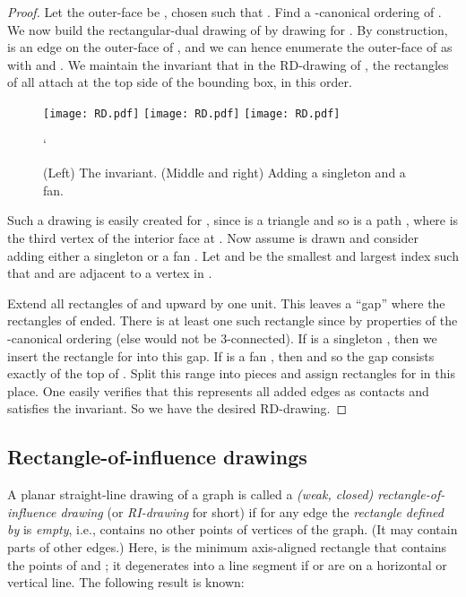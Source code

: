 \documentclass[12pt]{article}
\begin{document}
\begin{proof}
Let the outer-face be , chosen such that .
Find a -canonical ordering  of .  We
now build the rectangular-dual drawing of  by drawing  for 
.
By construction,  is an edge on the outer-face of , and
we can hence enumerate the outer-face of  as 
with  and .  
We maintain the invariant
that in the RD-drawing of , the rectangles of 
 all attach at the top side of the bounding
box, in this order.

\begin{figure}[ht]
\hspace*{\fill}
\texttt{[image: RD.pdf]}
\hspace*{\fill}
\texttt{[image: RD.pdf]}
\hspace*{\fill}
\texttt{[image: RD.pdf]}
\hspace*{\fill}
\caption{(Left) The invariant.  (Middle and right) 
Adding a singleton and a fan.  }
\label{fig:RD}`
\end{figure}

Such a drawing is easily created for , since  is a triangle and
so  is a path , where  is the third vertex
of the interior face at .
Now assume  is drawn and consider adding either
a singleton or a fan .  Let  and  be the smallest and 
largest index such that  and  are adjacent to a vertex in .  

Extend all rectangles of  and  upward
by one unit.    This leaves a ``gap'' where the rectangles
of  ended. There is at least one such rectangle
since  by properties of the -canonical ordering (else  would not be 3-connected).  
If  is a singleton , then we insert the rectangle for  into
this gap.  If  is a fan , then 
and so the gap consists exactly of the top of .  Split this
range into  pieces and assign rectangles for 
 in this place.  One easily verifies that this represents
all added edges as contacts and satisfies the invariant.
So we have the desired RD-drawing.
\end{proof}


\subsection{Rectangle-of-influence drawings}
\label{sec:ri-drawing}


A planar straight-line drawing of a graph is called a {\em (weak, closed)
rectangle-of-influence drawing} (or {\em RI-drawing} for short) if
for any edge  the {\em rectangle  defined by } is
{\em empty}, i.e., contains no other points of vertices of the graph.  (It
may contain parts of other edges.)  Here,   is the minimum
axis-aligned rectangle that contains the points of  and ; it 
degenerates into a line segment if  or  are on a horizontal or
vertical line.  The following result is known:
\end{document}
